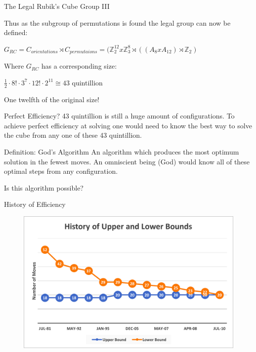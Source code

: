 \documentclass{beamer}
\begin{document}
\begin{frame}[t]{The Legal Rubik's Cube Group III}

Thus as the subgroup of permutations is found the legal group can now be defined:

\begin{center}
$G_{RC} = C_{orientations} \rtimes C_{permutaions} = (\mathbb{Z}_2^{12} x \mathbb{Z}_3^8 \rtimes ((A_{8} x A_{12}) \rtimes \mathbb{Z}_2)$
\end{center}
Where $G_{RC}$ has a corresponding size:

\begin{center}
$\frac{1}{2}\cdot 8! \cdot 3^7 \cdot 12! \cdot 2^{11} \cong 43$ quintillion
\end{center}
One twelfth of the original size!
\end{frame}

\begin{frame}[t]{Perfect Efficiency?}
43 quintillion is still a huge amount of configurations.
To achieve perfect efficiency at solving one would need to know the best way to solve the cube from any one of these 43 quintillion. 
\begin{block}{Definition: God's Algorithm}
An algorithm which produces the most optimum solution in the fewest moves. An omniscient being (God) would know all of these optimal steps from any configuration. 
\end{block}

Is this algorithm possible?
\end{frame}

\begin{frame}[t]{History of Efficiency}
\begin{figure}
\includegraphics[scale=.15]{historybound.png}
\end{figure}
\end{frame}
\end{document}

